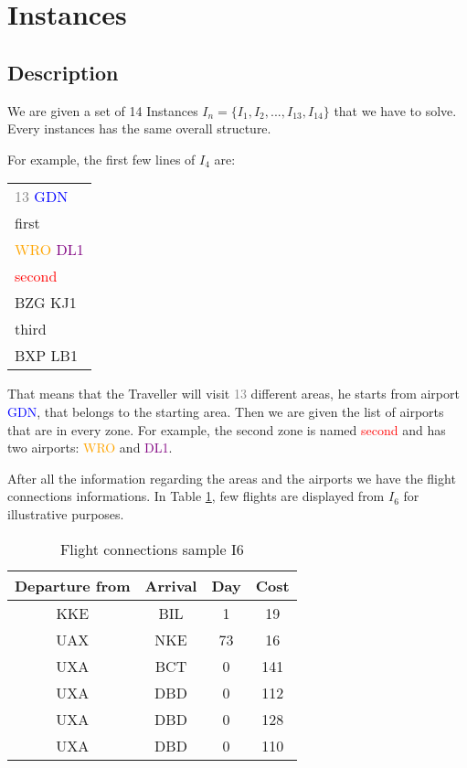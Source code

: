 \section{Instances}
\subsection{Description}

We are given a set of 14 Instances $I_{n}=\{I_1,I_2,...,I_{13},I_{14}\}$ that we have to solve.
Every instances has the same overall structure.

For example, the first few lines of $I_4$ are:

\begin{center}
    \begin{tabular}{l}
        \textcolor{gray}{13} \textcolor{blue}{GDN}      \\
        first                                           \\
        \textcolor{orange}{WRO} \textcolor{purple}{DL1} \\
        \textcolor{red}{second}                         \\
        BZG KJ1                                         \\
        third                                           \\
        BXP LB1                                         \\
    \end{tabular}
\end{center}

That means that the Traveller will visit \textcolor{gray}{13} different areas, he starts from airport \textcolor{blue}{GDN}, that belongs to the starting area.
Then we are given the list of airports that are in every zone.
For example, the second zone is named \textcolor{red}{second} and has two airports: \textcolor{orange}{WRO} and \textcolor{purple}{DL1}.

After all the information regarding the areas and the airports we have the flight connections informations. In Table \ref{table:Flight connections sample I6}, few flights are displayed from $I_6$ for illustrative purposes.
\begin{table}[!ht]
    \centering
    \caption{Flight connections sample I6}
    \begin{tabular}{||cccc||}
        \toprule
        Departure from & Arrival & Day & Cost \\ [1ex]
        \midrule
        KKE            & BIL     & 1   & 19   \\
        UAX            & NKE     & 73  & 16   \\
        UXA            & BCT     & 0   & 141  \\
        UXA            & DBD     & 0   & 112  \\
        UXA            & DBD     & 0   & 128  \\
        UXA            & DBD     & 0   & 110  \\
        [1ex]
        \bottomrule
    \end{tabular}

    \label{table:Flight connections sample I6}
\end{table}


